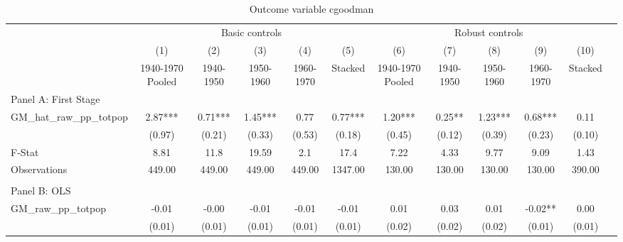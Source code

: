  \begin{table}[htbp]\centering {} \begin{threeparttable} \caption{Outcome variable cgoodman} \begin{tabular}{l*{11}{c}} \toprule
          &\multicolumn{5}{c}{Basic controls}                                   &\multicolumn{5}{c}{Robust controls}                                  \\\cmidrule(lr){2-6}\cmidrule(lr){7-11}
          &\multicolumn{1}{c}{(1)}&\multicolumn{1}{c}{(2)}&\multicolumn{1}{c}{(3)}&\multicolumn{1}{c}{(4)}&\multicolumn{1}{c}{(5)}&\multicolumn{1}{c}{(6)}&\multicolumn{1}{c}{(7)}&\multicolumn{1}{c}{(8)}&\multicolumn{1}{c}{(9)}&\multicolumn{1}{c}{(10)}\\
          &\multicolumn{1}{c}{1940-1970 Pooled}&\multicolumn{1}{c}{1940-1950}&\multicolumn{1}{c}{1950-1960}&\multicolumn{1}{c}{1960-1970}&\multicolumn{1}{c}{Stacked}&\multicolumn{1}{c}{1940-1970 Pooled}&\multicolumn{1}{c}{1940-1950}&\multicolumn{1}{c}{1950-1960}&\multicolumn{1}{c}{1960-1970}&\multicolumn{1}{c}{Stacked}\\
\cmidrule(lr){1-11}
\multicolumn{10}{l}{Panel A: First Stage}\\
\cmidrule(lr){1-11}
GM\_hat\_raw\_pp\_totpop&      2.87***&      0.71***&      1.45***&      0.77   &      0.77***&      1.20***&      0.25** &      1.23***&      0.68***&      0.11   \\
          &    (0.97)   &    (0.21)   &    (0.33)   &    (0.53)   &    (0.18)   &    (0.45)   &    (0.12)   &    (0.39)   &    (0.23)   &    (0.10)   \\
\midrule
F-Stat    &      8.81   &      11.8   &     19.59   &       2.1   &      17.4   &      7.22   &      4.33   &      9.77   &      9.09   &      1.43   \\
Observations&    449.00   &    449.00   &    449.00   &    449.00   &   1347.00   &    130.00   &    130.00   &    130.00   &    130.00   &    390.00   \\
\cmidrule[\heavyrulewidth](lr){1-11} \\ \cmidrule[\heavyrulewidth](lr){1-11}
\multicolumn{10}{l}{Panel B: OLS}\\
\cmidrule(lr){1-11}
GM\_raw\_pp\_totpop&     -0.01   &     -0.00   &     -0.01   &     -0.01   &     -0.01   &      0.01   &      0.03   &      0.01   &     -0.02** &      0.00   \\
          &    (0.01)   &    (0.01)   &    (0.01)   &    (0.01)   &    (0.01)   &    (0.02)   &    (0.02)   &    (0.02)   &    (0.01)   &    (0.01)   \\

\end{tabular}
\end{threeparttable}
\end{table}
